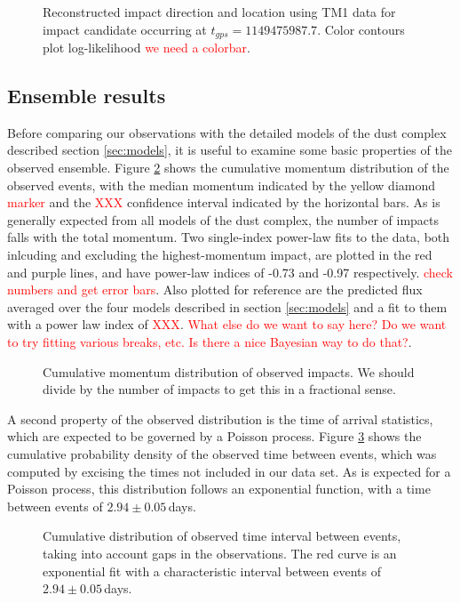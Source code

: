 \documentclass[twocolumn, trackchanges]{aastex61}
\newcommand{\red}[1]{\textcolor{red}{#1}}
\begin{document}
\begin{figure}[h!]
\gridline{
\fig{figures/badSky.eps}{\columnwidth}{(a) Impact origin in \red{frame name?} frame}}
\caption{Reconstructed impact direction and location using TM1 data for impact candidate occurring at $t_{gps}=1149475987.7$. Color contours plot log-likelihood \red{we need a colorbar}.\label{fig:typExampleLocation}}
\end{figure}

\FloatBarrier
\subsection{Ensemble results}
Before comparing our observations with the detailed models of the dust complex described section \ref{sec:models}, it is useful to examine some basic properties of the observed ensemble. Figure \ref{fig:CDF_P} shows the cumulative momentum distribution of the observed events, with the median momentum indicated by the yellow diamond \red{marker} and the \red{XXX} confidence interval indicated by the horizontal bars.  As is generally expected from all models of the dust complex, the number of impacts falls with the total momentum. Two single-index power-law fits to the data, both inlcuding and excluding the highest-momentum impact, are plotted in the red and purple lines, and have power-law indices of -0.73 and -0.97 respectively. \red{check numbers and get error bars}. Also plotted for reference are the predicted flux averaged over the four models described in section \ref{sec:models} and a fit to them with a power law index of \red{XXX}. \red{What else do we want to say here? Do we want to try fitting various breaks, etc.  Is there a nice Bayesian way to do that?}.

\begin{figure}
\caption{Cumulative momentum distribution of observed impacts. We should divide by the number of impacts to get this in a fractional sense. \label{fig:CDF_P}}
\end{figure}

A second property of the observed distribution is the time of arrival statistics, which are expected to be governed by a Poisson process. Figure \ref{fig:CDF_rate} shows the cumulative probability density of the observed time between events, which was computed by excising the times not included in our data set. As is expected for a Poisson process, this distribution follows an exponential function, with a time between events of $2.94\pm0.05\,$days. 
\begin{figure}
\caption{Cumulative distribution of observed time interval between events, taking into account gaps in the observations. The red curve is an exponential fit with a characteristic interval between events of $2.94\pm0.05\,$days. \label{fig:CDF_rate}}
\end{figure}
\end{document}
